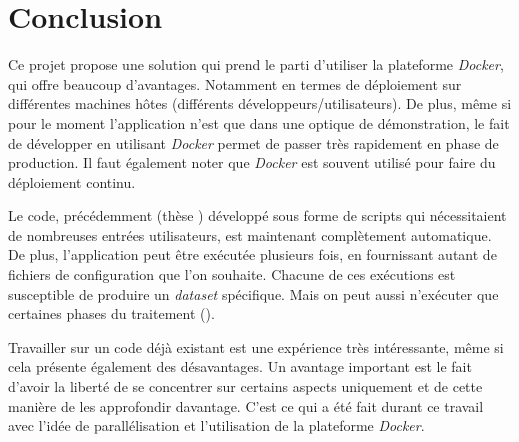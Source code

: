 \chapter{Conclusion}
\label{ch:conclusion}

Ce projet propose une solution qui prend le parti d'utiliser la plateforme \emph{Docker}, qui offre beaucoup d'avantages. Notamment en termes de déploiement sur différentes machines hôtes (différents développeurs/utilisateurs). De plus, même si pour le moment l'application n'est que dans une optique de démonstration, le fait de développer en utilisant \emph{Docker} permet de passer très rapidement en phase de production. Il faut également noter que \emph{Docker} est souvent utilisé pour faire du déploiement continu.

Le code, précédemment (thèse \thLeite) développé sous forme de scripts qui nécessitaient de nombreuses entrées utilisateurs, est maintenant complètement automatique. De plus, l'application peut être exécutée plusieurs fois, en fournissant autant de fichiers de configuration que l'on souhaite. Chacune de ces exécutions est susceptible de produire un \emph{dataset} spécifique. Mais on peut aussi n'exécuter que certaines phases du traitement (\thLeite).

Travailler sur un code déjà existant est une expérience très intéressante, même si cela présente également des désavantages. Un avantage important est le fait d'avoir la liberté de se concentrer sur certains aspects uniquement et de cette manière de les approfondir davantage. C'est ce qui a été fait durant ce travail avec l'idée de parallélisation et l'utilisation de la plateforme \emph{Docker}.
